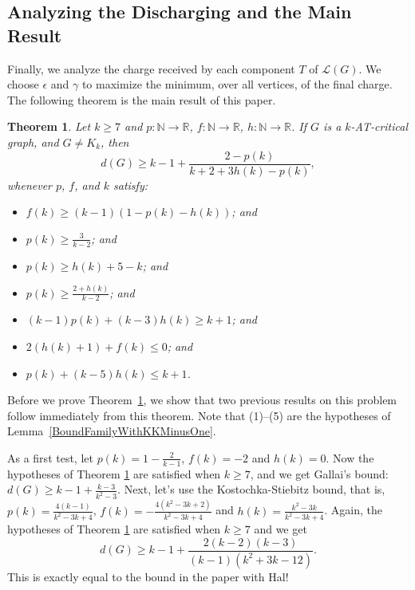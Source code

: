 \documentclass[12pt]{article}
\theoremstyle{plain}
\newtheorem{thm}{Theorem}[section]
\theoremstyle{definition}
\theoremstyle{remark}
\newcommand{\fancy}[1]{\mathcal{#1}}
\newcommand{\IN}{\mathbb{N}}
\newcommand{\IR}{\mathbb{R}}
\newcommand{\T}{\fancy{T}}
\renewcommand{\L}{\fancy{L}}
\newcommand{\func}[3]{#1\colon #2 \rightarrow #3}
\begin{document}
\subsection{Analyzing the Discharging and the Main Result}
Finally, we analyze the charge received by each component $T$ of $\L(G)$.  We choose $\epsilon$ and $\gamma$ to maximize the minimum, over all vertices, of the final charge.  The following theorem is the main result of this paper.

\begin{thm}\label{UberTheorem}
	Let $k \ge 7$ and $\func{p}{\IN}{\IR}$, $\func{f}{\IN}{\IR}$, $\func{h}{\IN}{\IR}$.  If $G$ is a $k$-AT-critical graph, and $G\ne K_k$, then 
	\[d(G) \ge k-1 + \frac{2-p(k)}{k+2 + 3h(k) - p(k)},\]
	whenever $p$, $f$, and $k$ satisfy:
	\begin{itemize}
	\item $f(k) \ge (k-1)(1- p(k) - h(k))$; and	
	    \item $p(k) \ge \frac{3}{k-2}$; and
		\item $p(k) \ge h(k) + 5 - k$; and
		\item $p(k) \ge \frac{2+h(k)}{k-2}$; and
		\item $(k-1)p(k) + (k-3)h(k) \ge k+1$; and
		\item $2(h(k) + 1) + f(k) \le 0$; and
		\item $p(k) + (k-5)h(k) \le k+1$.
	\end{itemize}
\end{thm}

Before we prove Theorem~\ref{UberTheorem}, we show that two previous results on this problem follow immediately from this 
theorem.  
Note that (1)--(5) are the hypotheses of Lemma~\ref{BoundFamilyWithKKMinusOne}.

As a first test, let $p(k) = 1 - \frac{2}{k-1}$, $f(k) = -2$ and $h(k) = 0$.  Now the hypotheses of Theorem \ref{UberTheorem} are satisfied when $k\ge7$, and we get Gallai's bound: $d(G) \ge k-1 + \frac{k-3}{k^2-3}$. 
Next, let's use the Kostochka-Stiebitz bound, that is, $p(k) = \frac{4(k-1)}{k^2 - 3k + 4}$, $f(k) = -\frac{4(k^2-3k+2)}{k^2-3k+4}$ and $h(k) = \frac{k^2 - 3k}{k^2-3k+4}$.  Again, the hypotheses of Theorem \ref{UberTheorem} are satisfied when $k \ge 7$ and we get
\[d(G) \ge k-1 + \frac{2(k-2)(k-3)}{(k-1)(k^2 + 3k - 12)}.\]
This is exactly equal to the bound in the paper with Hal!  
\end{document}
